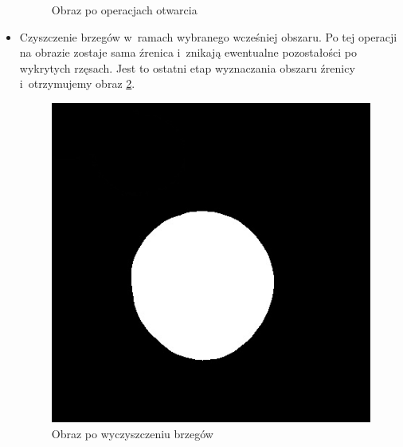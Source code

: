 \begin{itemize}
\begin{figure}
\begin{center}
\caption{Obraz po operacjach otwarcia}
\label{fig:otwarcie2}
\end{center}
\end{figure}
\item Czyszczenie brzegów w~ramach wybranego wcześniej obszaru. Po tej operacji na obrazie zostaje sama źrenica i~znikają ewentualne pozostałości po wykrytych rzęsach. Jest to ostatni etap wyznaczania obszaru źrenicy i~otrzymujemy obraz \ref{fig:zrenica2}.
\begin{figure}
\begin{center}
\includegraphics[scale=0.5]{roi2.jpg}
\caption{Obraz po wyczyszczeniu brzegów}
\label{fig:zrenica2}
\end{center}
\end{figure}
\end{itemize}


